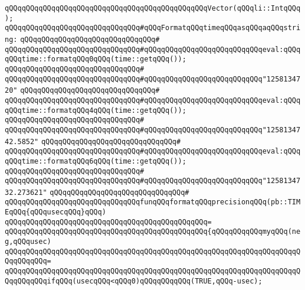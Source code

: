 \verb|qQQqqQQqqQQqqQQqqQQqqQQqqQQqqQQqqQQqqQQqqQQqqQQqVector(qQQqli::IntqQQq);|\newline
\newline
\newline
\verb|qQQqqQQqqQQqqQQqqQQqqQQqqQQqqQQq#qQQqFormatqQQqtimeqQQqasqQQqaqQQqstring:|\newline
\verb|qQQqqQQqqQQqqQQqqQQqqQQqqQQqqQQq#|\newline
\verb|qQQqqQQqqQQqqQQqqQQqqQQqqQQqqQQq#qQQqqQQqqQQqqQQqqQQqqQQqqQQqeval:qQQqqQQqtime::formatqQQq0qQQq(time::getqQQq());|\newline
\verb|qQQqqQQqqQQqqQQqqQQqqQQqqQQqqQQq#|\newline
\verb|qQQqqQQqqQQqqQQqqQQqqQQqqQQqqQQq#qQQqqQQqqQQqqQQqqQQqqQQqqQQq"1258134720"|\newline
\verb|qQQqqQQqqQQqqQQqqQQqqQQqqQQqqQQq#|\newline
\verb|qQQqqQQqqQQqqQQqqQQqqQQqqQQqqQQq#qQQqqQQqqQQqqQQqqQQqqQQqqQQqeval:qQQqqQQqtime::formatqQQq4qQQq(time::getqQQq());|\newline
\verb|qQQqqQQqqQQqqQQqqQQqqQQqqQQqqQQq#|\newline
\verb|qQQqqQQqqQQqqQQqqQQqqQQqqQQqqQQq#qQQqqQQqqQQqqQQqqQQqqQQqqQQq"1258134742.5852"|\newline
\verb|qQQqqQQqqQQqqQQqqQQqqQQqqQQqqQQq#|\newline
\verb|qQQqqQQqqQQqqQQqqQQqqQQqqQQqqQQq#qQQqqQQqqQQqqQQqqQQqqQQqqQQqeval:qQQqqQQqtime::formatqQQq6qQQq(time::getqQQq());|\newline
\verb|qQQqqQQqqQQqqQQqqQQqqQQqqQQqqQQq#|\newline
\verb|qQQqqQQqqQQqqQQqqQQqqQQqqQQqqQQq#qQQqqQQqqQQqqQQqqQQqqQQqqQQq"1258134732.273621"|\newline
\verb|qQQqqQQqqQQqqQQqqQQqqQQqqQQqqQQq#|\newline
\verb|qQQqqQQqqQQqqQQqqQQqqQQqqQQqqQQqfunqQQqformatqQQqprecisionqQQq(pb::TIMEqQQq{qQQqusecqQQq}qQQq)|\newline
\verb|qQQqqQQqqQQqqQQqqQQqqQQqqQQqqQQqqQQqqQQqqQQqqQQq=|\newline
\verb|qQQqqQQqqQQqqQQqqQQqqQQqqQQqqQQqqQQqqQQqqQQqqQQq{qQQqqQQqqQQqmyqQQq(neg,qQQqusec)|\newline
\verb|qQQqqQQqqQQqqQQqqQQqqQQqqQQqqQQqqQQqqQQqqQQqqQQqqQQqqQQqqQQqqQQqqQQqqQQqqQQqqQQq=|\newline
\verb|qQQqqQQqqQQqqQQqqQQqqQQqqQQqqQQqqQQqqQQqqQQqqQQqqQQqqQQqqQQqqQQqqQQqqQQqqQQqqQQqifqQQq(usecqQQq<qQQq0)qQQqqQQqqQQq(TRUE,qQQq-usec);|\newline
